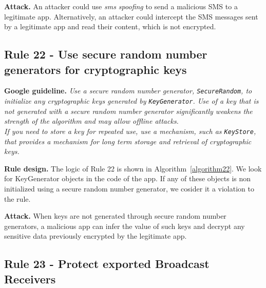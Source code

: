 \textbf{Attack.} An attacker could use \textit{sms spoofing} to send a malicious SMS to a legitimate app. Alternatively, an attacker could intercept the SMS messages sent by a legitimate app and read their content, which is not encrypted.

\subsection{Rule 22 - Use secure random number generators for cryptographic keys} 
\textbf{Google guideline.} 
\emph{Use a secure random number generator, \texttt{SecureRandom}, to initialize any cryptographic keys generated by \texttt{KeyGenerator}. Use of a key that is not generated with a secure random number generator significantly weakens the strength of the algorithm and may allow offline attacks.
\\
If you need to store a key for repeated use, use a mechanism, such as \texttt{KeyStore}, that provides a mechanism for long term storage and retrieval of cryptographic keys.}

\textbf{Rule design.} The logic of Rule 22 is shown in Algorithm~\ref{algorithm22}. We look for KeyGenerator objects in the code of the app. If any of these objects is non initialized using a secure random number generator, we cosider it a violation to the rule. 

\setcounter{algocf}{21}
\begin{algorithm}[]
\SetAlgoLined
{}
\caption{}
\label{algorithm22}
\end{algorithm}

\textbf{Attack.} When keys are not generated through secure random number generators, a malicious app can infer the value of such keys and decrypt any sensitive data previously encrypted by the legitimate app. 

\subsection{Rule 23 - Protect exported Broadcast Receivers} 

